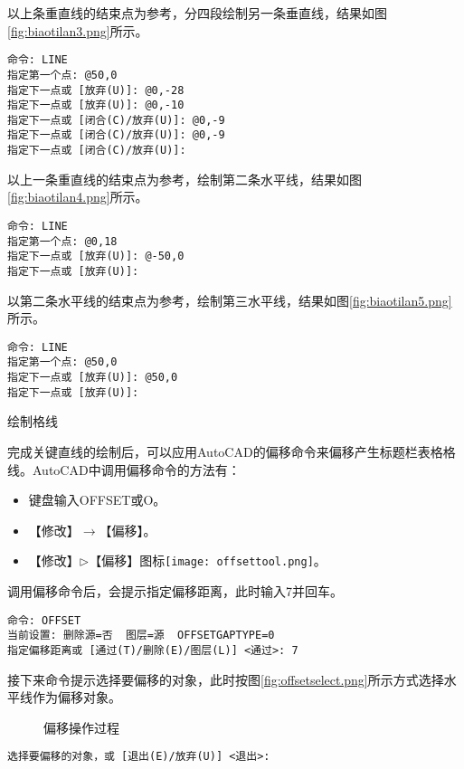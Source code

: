 \begin{procedure}
以上条重直线的结束点为参考，分四段绘制另一条垂直线，结果如图\ref{fig:biaotilan3.png}所示。
\begin{lstlisting}
命令: LINE
指定第一个点: @50,0
指定下一点或 [放弃(U)]: @0,-28
指定下一点或 [放弃(U)]: @0,-10
指定下一点或 [闭合(C)/放弃(U)]: @0,-9
指定下一点或 [闭合(C)/放弃(U)]: @0,-9
指定下一点或 [闭合(C)/放弃(U)]:
\end{lstlisting}

以上一条重直线的结束点为参考，绘制第二条水平线，结果如图\ref{fig:biaotilan4.png}所示。
\begin{lstlisting}
命令: LINE
指定第一个点: @0,18
指定下一点或 [放弃(U)]: @-50,0
指定下一点或 [放弃(U)]:
\end{lstlisting}

以第二条水平线的结束点为参考，绘制第三水平线，结果如图\ref{fig:biaotilan5.png}所示。
\begin{lstlisting}
命令: LINE
指定第一个点: @50,0
指定下一点或 [放弃(U)]: @50,0
指定下一点或 [放弃(U)]:
\end{lstlisting}
\item 绘制格线

完成关键直线的绘制后，可以应用AutoCAD的偏移命令来偏移产生标题栏表格格线。AutoCAD中调用偏移命令的方法有：
\begin{itemize}
\item 键盘输入OFFSET或O。
\item 【修改】$\rightarrow$【偏移】。
\item 【修改】$\triangleright$【偏移】图标\texttt{[image: offsettool.png]}。
\end{itemize}

调用偏移命令后，会提示指定偏移距离，此时输入7并回车。
\begin{lstlisting}
命令: OFFSET
当前设置: 删除源=否  图层=源  OFFSETGAPTYPE=0
指定偏移距离或 [通过(T)/删除(E)/图层(L)] <通过>: 7
\end{lstlisting}

接下来命令提示选择要偏移的对象，此时按图\ref{fig:offsetselect.png}所示方式选择水平线作为偏移对象。
\begin{figure}[htbp]
\centering
{}\hspace{20pt}
\hspace{20pt}
\caption{偏移操作过程}
\end{figure}
\begin{lstlisting}
选择要偏移的对象，或 [退出(E)/放弃(U)] <退出>:
\end{lstlisting}


\end{procedure}
